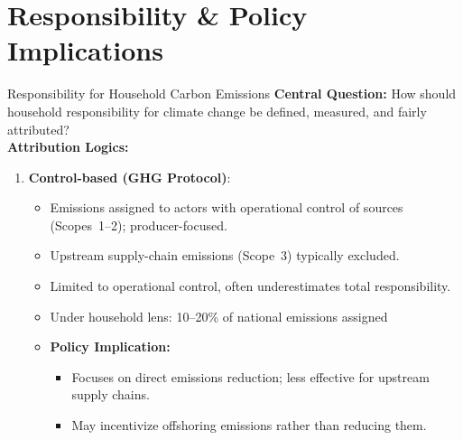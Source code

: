 \documentclass{beamer}
\begin{document}
\section{Responsibility \& Policy Implications}
\begin{frame}{Responsibility for Household Carbon Emissions}
\footnotesize
\vspace{-2.5em}
\textbf{Central Question:}  
How should household responsibility for climate change be defined, measured, and fairly attributed?\\
\vspace{0.5em}
\textbf{Attribution Logics:}
\begin{enumerate}
  \item \textbf{Control-based (GHG Protocol)}: 
    \begin{itemize}
      \footnotesize
      \item Emissions assigned to actors with operational control of sources (Scopes~1--2); producer-focused. 
      \item Upstream supply-chain emissions (Scope~3) typically excluded.
      \item Limited to operational control, often underestimates total responsibility.
      \item Under household lens: 10--20\% of national emissions assigned
      \item \textbf{Policy Implication:} 
        \begin{itemize}
          \item Focuses on direct emissions reduction; less effective for upstream supply chains.
          \item May incentivize offshoring emissions rather than reducing them.
        \end{itemize}
    \end{itemize}
  \end{enumerate}
  \end{frame}
\end{document}
